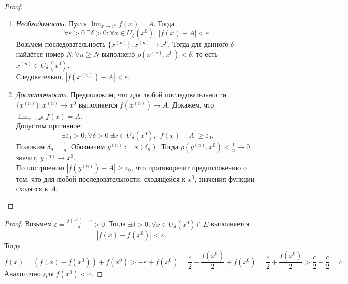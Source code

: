 \documentclass[12pt,a4paper]{report}
\begin{document}
\begin{proof}
    \begin{enumerate}
        \item[$\Longrightarrow$] \textit{Необходимость.} Пусть $\lim_{x\to x^0}f(x)=A$. Тогда
        \[
        \forall \varepsilon>0\ \exists \delta>0\colon \forall x\in \mathring{U}_\delta(x^0),\ |f(x)-A|<\varepsilon.
        \]
        Возьмём последовательность $\{x^{(n)}\}\colon x^{(n)}\to x^0$. Тогда для данного $\delta$ найдётся номер $N\colon \forall n\ge N$ выполнено $\rho(x^{(n)},x^0)<\delta$, то есть $x^{(n)}\in \mathring{U}_\delta(x^0)$. \\
        Следовательно, $|f(x^{(n)})-A|<\varepsilon$.

       \item[$\Longleftarrow$] \textit{Достаточность}. Предположим, что для любой последовательности $\{x^{(n)}\}\colon x^{(n)}\to x^0$ выполняется $f(x^{(n)})\to A$. Докажем, что $\lim_{x\to x^0}f(x)=A$. \\
        Допустим противное:
        \[
        \exists \varepsilon_0>0\colon \forall \delta>0\ \exists x\in \mathring{U}_\delta(x^0),\ |f(x)-A|\ge \varepsilon_0.
        \]
        Положим $\delta_n=\frac1n$. Обозначим $y^{(n)}:=x(\delta_n)$. Тогда $\rho(y^{(n)},x^0)<\frac1n\to0$, значит, $y^{(n)}\to x^0$. \\
        По построению $|f(y^{(n)})-A|\ge \varepsilon_0$, что противоречит предположению о том, что для любой последовательности, сходящейся к $x^0$, значения функции сходятся к $A$.
    \end{enumerate}
\end{proof}

\begin{proof}
    Возьмем $\varepsilon=\frac{f(x^0)-c}{2}>0$. Тогда $\exists \delta > 0\colon \forall x\in U_\delta(x^0)\cap E$ выполняется
    \[
    |f(x)-f(x^0)|<\varepsilon.
    \]
    Тогда
    \[
    f(x)=(f(x)-f(x^0))+f(x^0)>-\varepsilon+f(x^0)=\frac{c}{2}-\frac{f(x^0)}{2} + f(x^0)=\frac{c}{2}+\frac{f(x^0)}{2}>\frac{c}{2}+\frac{c}{2}=c.
    \]
    Аналогично для $f(x^0)<c$.
\end{proof}
\end{document}

